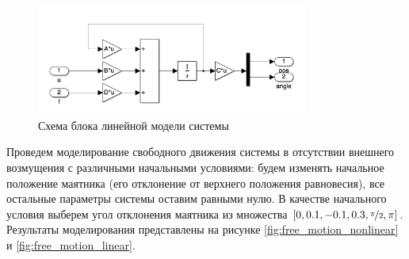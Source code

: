 \begin{figure}[ht!]
    \centering
    \includegraphics[width=0.8\textwidth]{media/scheme_linear.png}
    \caption{Схема блока линейной модели системы}
    \label{fig:scheme_linear}
\end{figure}

Проведем моделирование свободного движения системы в отсутствии внешнего 
возмущения с различными начальными условиями: будем изменять 
начальное положение маятника (его отклонение от верхнего положения равновесия), все остальные параметры 
системы оставим равными нулю. В качестве начального условия выберем угол отклонения маятника из множества 
$[0, 0.1, -0.1, 0.3, \nicefrac{\pi}{2}, \pi]$. Результаты моделирования представлены на
рисунке \ref{fig:free_motion_nonlinear} и \ref{fig:free_motion_linear}.

